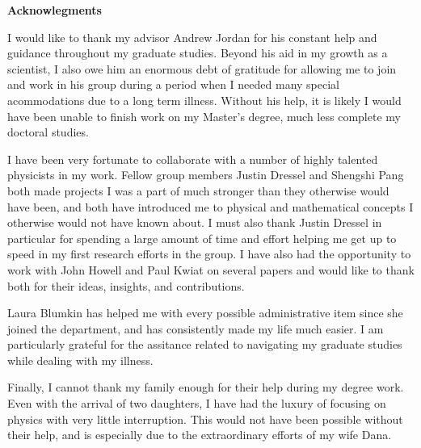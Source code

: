 \clearpage
\thispagestyle{plain}

\begin{center}
  \textbf{Acknowlegments}
\end{center}

I would like to thank my advisor Andrew Jordan for his constant help and guidance throughout my graduate studies.  Beyond his aid in my growth as a scientist, I also owe him an enormous debt of gratitude for allowing me to join and work in his group during a period when I needed many special acommodations due to a long term illness.  Without his help, it is likely I would have been unable to finish work on my Master's degree, much less complete my doctoral studies.

I have been very fortunate to collaborate with a number of highly talented physicists in my work.  Fellow group members Justin Dressel and Shengshi Pang both made projects I was a part of much stronger than they otherwise would have been, and both have introduced me to physical and mathematical concepts I otherwise would not have known about.  I must also thank Justin Dressel in particular for spending a large amount of time and effort helping me get up to speed in my first research efforts in the group.  I have also had the opportunity to work with John Howell and Paul Kwiat on several papers and would like to thank both for their ideas, insights, and contributions.

Laura Blumkin has helped me with every possible administrative item since she joined the department, and has consistently made my life much easier.  I am particularly grateful for the assitance related to navigating my graduate studies while dealing with my illness.

Finally, I cannot thank my family enough for their help during my degree work. Even with the arrival of two daughters, I have had the luxury of focusing on physics with very little interruption.  This would not have been possible without their help, and is especially due to the extraordinary efforts of my wife Dana. 

